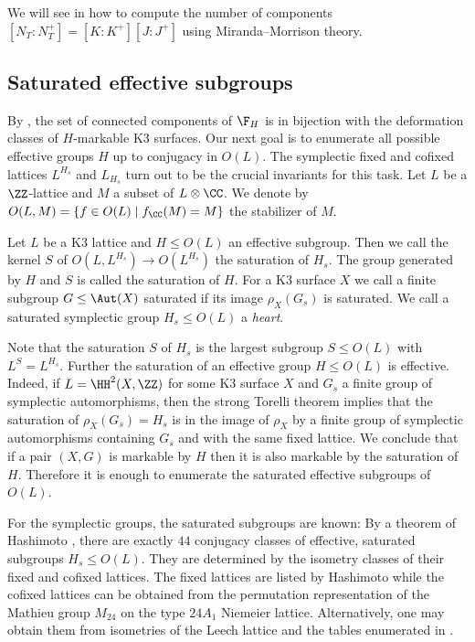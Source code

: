 \begin{remark}\label{rem:mmapplication}
We will see in 
how to compute the number of components $[N_T:N_T^+]=[K:K^+][J:J^+]$ using Miranda--Morrison theory.
\end{remark}


\subsection{Saturated effective subgroups}\label{HpolEnum}
By , the set of connected components of $\F_H$ is in bijection with the deformation classes of $H$-markable K3 surfaces.
Our next goal is to enumerate all possible effective groups $H$ up to conjugacy in $O(L)$.
The symplectic fixed and cofixed lattices $L^{H_s}$ and $L_{H_s}$ turn out to be the crucial invariants for this task.
Let $L$ be a $\ZZ$-lattice and $M$ a subset of $L \otimes \CC$. We denote by $O(L,M)=\{f \in O(L) \mid f_\CC(M)=M\}$ the stabilizer of $M$.

\begin{definition}
 Let $L$ be a K3 lattice and $H \leq O(L)$ an effective subgroup. Then we call the kernel $S$ of $O(L,L^{H_s}) \to O(L^{H_s})$ the saturation of $H_s$.
 The group generated by $H$ and $S$ is called the saturation of $H$.
 For a K3 surface $X$ we call a finite subgroup $G\leq \Aut(X)$ saturated if its image $\rho_X(G_s)$ is saturated.
 We call a saturated symplectic group $H_s\leq O(L)$ a \emph{heart}.
\end{definition}

\begin{remark}
Note that the saturation $S$ of $H_s$ is the largest subgroup $S\leq O(L)$ with $L^S=L^{H_s}$. Further the saturation of an effective group $H\leq O(L)$ is effective.
Indeed, if $L = \HH^2(X,\ZZ)$ for some K3 surface $X$ and $G_s$ a finite group of symplectic automorphisms, then the strong Torelli theorem implies that the saturation of $\rho_X(G_s)=H_s$ is in the image of $\rho_X$ by a finite group of symplectic automorphisms containing $G_s$ and with the same fixed lattice.
We conclude that if a pair $(X,G)$ is markable by $H$ then it is also markable by the saturation of $H$.
Therefore it is enough to enumerate the saturated effective subgroups of $O(L)$.
\end{remark}

\begin{remark}\label{rem:hashimoto}
For the symplectic groups, the saturated subgroups are known:
By a theorem of Hashimoto \cite{Hashimoto2012}, there are exactly $44$ conjugacy classes of effective, saturated subgroups $H_s \leq O(L)$.
They are determined by the isometry classes of their fixed and cofixed lattices.
The fixed lattices are listed by Hashimoto while the cofixed lattices can be obtained from the permutation representation of the Mathieu group $M_{24}$ on the type $24 A_1$ Niemeier lattice.
Alternatively, one may obtain them from isometries of the Leech lattice and the tables enumerated in \cite{mason2016}.
\end{remark}

